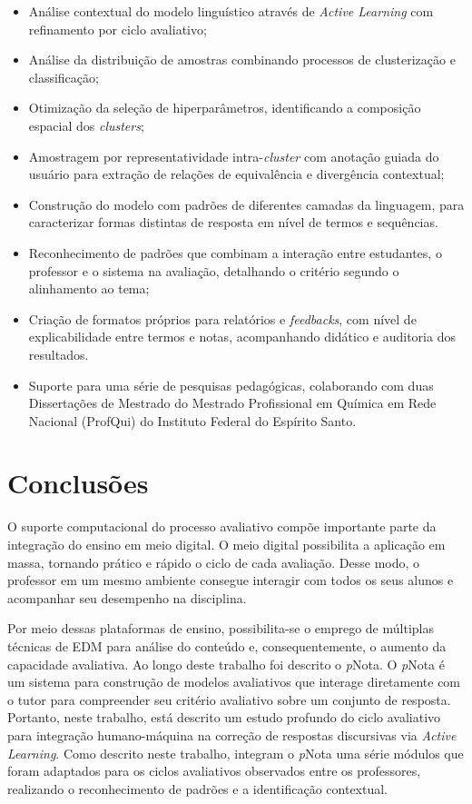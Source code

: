 \begin{itemize}
  \item Análise contextual do modelo linguístico através de \textit{Active Learning} com refinamento por ciclo avaliativo;
  \item Análise da distribuição de amostras combinando processos de clusterização e classificação;
  \item Otimização da seleção de hiperparâmetros, identificando a composição espacial dos \textit{clusters};
  \item Amostragem por representatividade intra-\textit{cluster} com anotação guiada do usuário para extração de relações de equivalência e divergência contextual;
  \item Construção do modelo com padrões de diferentes camadas da linguagem, para caracterizar formas distintas de resposta em nível de termos e sequências.
  \item Reconhecimento de padrões que combinam a interação entre estudantes, o professor e o sistema na avaliação, detalhando o critério segundo o alinhamento ao tema;
  \item Criação de formatos próprios para relatórios e \textit{feedbacks}, com nível de explicabilidade entre termos e notas, acompanhando didático e auditoria dos resultados.
  \item Suporte para uma série de pesquisas pedagógicas, colaborando com duas Dissertações de Mestrado do Mestrado Profissional em Química em Rede Nacional (ProfQui) do Instituto Federal do Espírito Santo.
\end{itemize}

\section{Conclusões}

O suporte computacional do processo avaliativo compõe importante parte da integração do ensino em meio digital. O meio digital possibilita a aplicação em massa, tornando prático e rápido o ciclo de cada avaliação. Desse modo, o professor em um mesmo ambiente consegue interagir com todos os seus alunos e acompanhar seu desempenho na disciplina. 

Por meio dessas plataformas de ensino, possibilita-se o emprego de múltiplas técnicas de EDM para análise do conteúdo e, consequentemente, o aumento da capacidade avaliativa. Ao longo deste trabalho foi descrito o \textit{p}Nota. O \textit{p}Nota é um sistema para construção de modelos avaliativos que interage diretamente com o tutor para compreender seu critério avaliativo sobre um conjunto de resposta. Portanto, neste trabalho, está descrito um estudo profundo do ciclo avaliativo para integração humano-máquina na correção de respostas discursivas via \textit{Active Learning}. Como descrito neste trabalho, integram o \textit{p}Nota uma série módulos que foram adaptados para os ciclos avaliativos observados entre os professores, realizando o reconhecimento de padrões e a identificação contextual.

